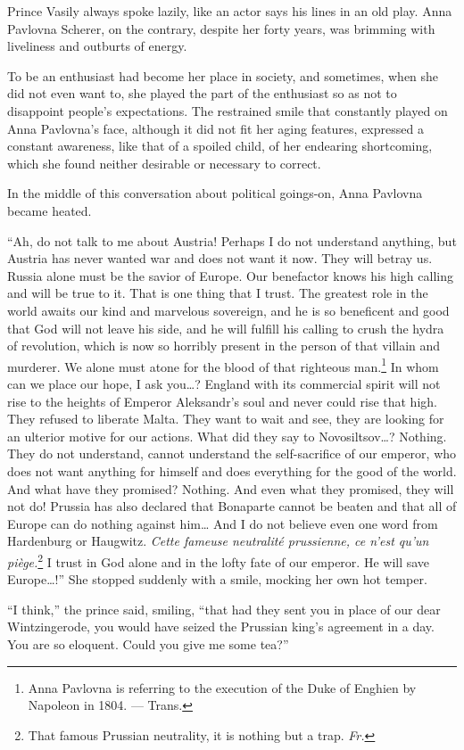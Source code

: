 Prince Vasily always spoke lazily, like an actor says his lines in an
old play. Anna Pavlovna Scherer, on the contrary, despite her forty
years, was brimming with liveliness and outburts of energy.

To be an enthusiast had become her place in society, and sometimes,
when she did not even want to, she played the part of the enthusiast
so as not to disappoint people's expectations. The restrained smile
that constantly played on Anna Pavlovna's face, although it did not
fit her aging features, expressed a constant awareness, like that of a
spoiled child, of her endearing shortcoming, which she found neither
desirable or necessary to correct.

In the middle of this conversation about political goings-on, Anna
Pavlovna became heated.

``Ah, do not talk to me about Austria! Perhaps I do not understand
anything, but Austria has never wanted war and does not want it
now. They will betray us. Russia alone must be the savior of
Europe. Our benefactor knows his high calling and will be true to
it. That is one thing that I trust. The greatest role in the world
awaits our kind and marvelous sovereign, and he is so beneficent and
good that God will not leave his side, and he will fulfill his calling
to crush the hydra of revolution, which is now so horribly present in
the person of that villain and murderer. We alone must atone for the
blood of that righteous man.\footnote{Anna Pavlovna is referring to
  the execution of the Duke of Enghien by Napoleon in 1804. ---
  Trans.} In whom can we place our hope, I ask you\ldots{}? England
with its commercial spirit will not rise to the heights of Emperor
Aleksandr's soul and never could rise that high. They refused to
liberate Malta. They want to wait and see, they are looking for an
ulterior motive for our actions. What did they say to
Novosiltsov\ldots{}? Nothing. They do not understand, cannot
understand the self-sacrifice of our emperor, who does not want
anything for himself and does everything for the good of the
world. And what have they promised? Nothing. And even what they
promised, they will not do! Prussia has also declared that Bonaparte
cannot be beaten and that all of Europe can do nothing against
him\ldots{} And I do not believe even one word from Hardenburg or
Haugwitz. \textit{Cette fameuse neutralit\'e prussienne, ce n'est
  qu'un pi\`ege.}\footnote{That famous Prussian neutrality, it is
  nothing but a trap. \textit{Fr.}} I trust in God alone and in the
lofty fate of our emperor. He will save Europe\ldots{}!'' She stopped
suddenly with a smile, mocking her own hot temper. %

``I think,'' the prince said, smiling, ``that had they sent you in
place of our dear Wintzingerode, you would have seized the Prussian
king's agreement in a day. You are so eloquent. Could you give me some
tea?'' %

